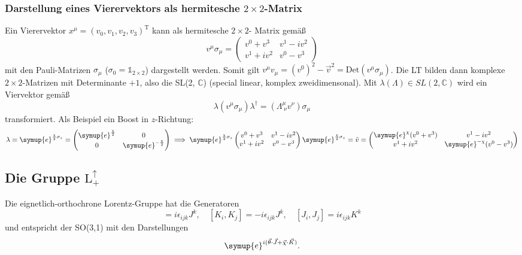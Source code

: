 \documentclass[
  captions=tableheading,  %
  titlepage=firstiscover, %
]{scrartcl}
\begin{document}
\subsubsection{Darstellung eines Vierervektors als hermitesche \texorpdfstring{$2 \times 2$}{PDFstring}-Matrix}
\label{sub:2times2}
Ein Vierervektor $x^{\mu} = (v_0, v_1, v_2, v_3)^\text{T}$ kann als 
hermitesche $2 \times 2$- Matrix gemäß
\begin{equation*}
  v^{\mu} \sigma_{\mu} = 
  \begin{pmatrix}
    v^0 + v^3& v^1 - iv^2 \\
    v^1 + iv^2 & v^0 - v^3
  \end{pmatrix}
\end{equation*}
mit den Pauli-Matrizen $\sigma_{\mu}$ ($\sigma_0 = \mathbb{1}_{2 \times 2}$) dargestellt werden.
Somit gilt $v^{\mu} v_{\mu} = {(v^0)^2 - \vec{v}^2} = \text{Det}(v^{\mu} \sigma_{\mu})$.
Die LT bilden dann komplexe $2\times 2$-Matrizen mit Determinante $+ 1$, also  
die SL(2, $\mathbb{C}$) (special linear, komplex zweidimensonal).
Mit $\lambda(\Lambda) \in SL(2, \mathbb{C})$ wird ein Viervektor gemäß
\begin{equation*}
  \lambda (v^{\mu} \sigma_{\mu}) \lambda^{\dagger} = (\Lambda_{\; \nu}^{\mu} v^{\nu}) \sigma_{\mu}
\end{equation*}
transformiert.
Als Beispiel ein Boost in $z$-Richtung:
\begin{equation*}
  \lambda  = \symup{e}^{\frac{\chi}{2} \sigma_z}
  =
  \begin{pmatrix}
    \symup{e}^{\frac{\chi}{2}} & 0 \\
    0 & \symup{e}^{-\frac{\chi}{2}}
  \end{pmatrix}
  \implies  
  \symup{e}^{\frac{\chi}{2} \sigma_z} 
  \begin{pmatrix}
    v^0 + v^3& v^1 - iv^2 \\
    v^1 + iv^2 & v^0 - v^3
  \end{pmatrix}
  \symup{e}^{\frac{\chi}{2} \sigma_z} 
  = \tilde{v} =
  \begin{pmatrix}
    \symup{e}^{\chi} (v^0 + v^3) & v^1 - iv^2 \\
    v^1 + iv^2 & \symup{e}^{-\chi}(v^0 - v^3)
  \end{pmatrix}
\end{equation*}
\subsection{Die Gruppe \texorpdfstring{$\text{L}_+^{\uparrow}$}{PDFstring} }
Die eignetlich-orthochrone Lorentz-Gruppe hat die Generatoren 
\begin{equation}
  [J_i,J_j] = i \epsilon_{ijk} J^k,\quad [K_i, K_j] = - i \epsilon_{ijk} J^k, 
  \quad [J_i,J_j] = i \epsilon_{ijk} K^k \label{eqn:genspinor}
\end{equation}
und entspricht der SO(3,1) mit den Darstellungen
\begin{equation*}
  \symup{e}^{i(\vec{\theta} \cdot \vec{J} + \vec{\chi} \cdot \vec{K})}.
\end{equation*}
\end{document}
